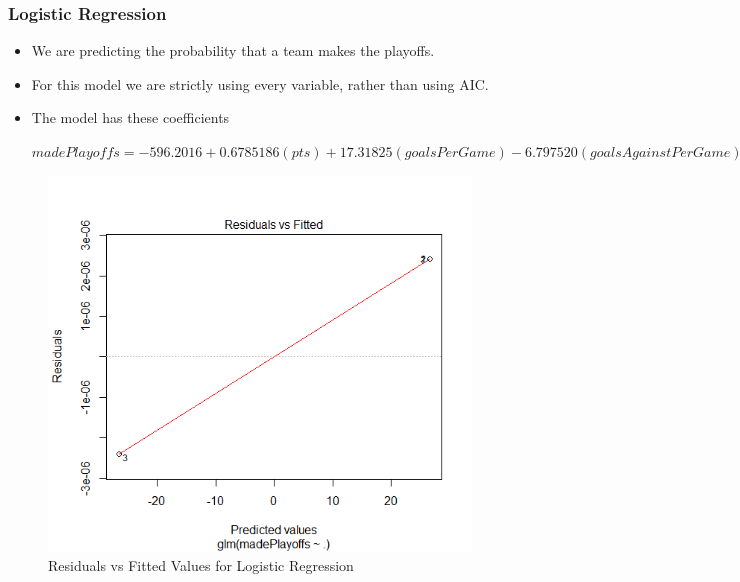 \documentclass{beamer}
\begin{document}
\begin{frame}
	\frametitle{Logistic Regression}
	\begin{itemize}
		\item We are predicting the probability that a team makes the playoffs. 
		\item For this model we are strictly using every variable, rather than using AIC. 
		\item The model has these coefficients
		\begin{center}$
			madePlayoffs = -596.2016 + 0.6785186(pts) + 17.31825(goalsPerGame) - 6.797520(goalsAgainstPerGame) - 18.07236(evGAARatio) - 0.1268944(powerPlayPercentage) - 0.03467402(powerPlayGoals) - 0.1270233(powerPlayGoalsAgainst) - 0.004215109(powerPlayOpportunities) - 0.04239098(penaltyKillPercentage) - 0.3554432(shotsPerGame) - 16.05426(winLeadFirstPer) + 3.368749(winLeadSecondPer) + 3.367920(winOutshootOpp) + 12.48498(winOutshotByOpp) + 0.07043268(faceOffsTaken) - 0.1464181(faceOffsWon) + 7.594018(faceOffWinPercentage) - 1.656188(shootingPctg) + 214.9347(savePctg)   
			$\end{center}
	\end{itemize}
\end{frame}
\begin{frame}
\begin{figure}
	\centering
	\includegraphics[width=0.7\linewidth]{Log1}
	\caption{Residuals vs Fitted Values for Logistic Regression}
	\label{fig:Residuals vs Fitted Values for Logistic Regression}
\end{figure}
\end{frame}
\end{document}

